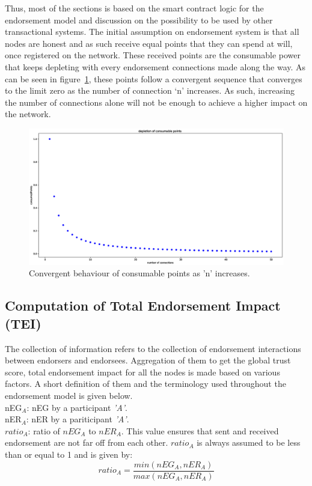 Thus, most of the sections is based on the smart contract logic for the
endorsement model and discussion on the possibility to be used by other
transactional systems.  The initial assumption on 
endorsement system is that all nodes are honest and as such receive equal
points that they can spend at will, once registered on the network. These
received points are the consumable power that keeps depleting with every
endorsement connections made along the way. As can be seen in
figure~\ref{consumablePoint}, these points follow a convergent sequence that
converges to the limit zero as the number of connection `n' increases. As such,
increasing the number of connections alone will not be enough to achieve a
higher impact on the network.
\begin{figure}
	\centering
	\includegraphics[width=1.2\textwidth]{Images/ConsumablePoints.eps}
	\caption{Convergent behaviour of consumable points as 'n' increases.}
	\label{consumablePoint}
\end{figure}
\subsection{Computation of Total Endorsement Impact (TEI)} 
The collection of information refers to the collection of endorsement
interactions between endorsers and endorsees.  Aggregation of them to get the
global trust score, total endorsement impact for all the nodes is made based on
various factors. A short definition of them and the terminology used throughout
the endorsement model is given below. \\ 
\acrshort{nEG}$_A$: \ac{nEG} by a participant \textit{'A'}. \\

\acrshort{nER}$_A$: \ac{nER} by a pariticipant \textit{'A'}. \\
{$ratio_A$}: ratio of \textit{$nEG_A$} to \textit{$nER_A$}. This value ensures
that sent and received endorsement are not far off from  each other.
\textit{$ratio_A$} is always assumed to be less than or equal to 1 and is given
by: 
\begin{equation}
	ratio_A = \frac{min(nEG_A,nER_A)}{max(nEG_A,nER_A)} 
\end{equation}

